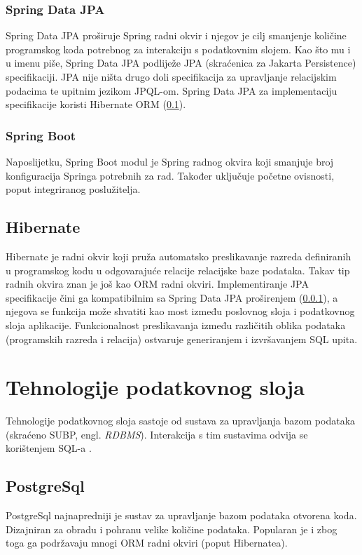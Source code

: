 \documentclass[times, utf8, zavrsni]{fer}
\begin{document}
			\subsubsection{Spring Data JPA}
			\label{subsubsec:spingdatajpa}
			Spring Data JPA proširuje Spring radni okvir i njegov je cilj smanjenje količine programskog koda potrebnog za interakciju s podatkovnim slojem. Kao što mu i u imenu piše, Spring Data JPA podliježe JPA (skraćenica za Jakarta Persistence) specifikaciji. JPA nije ništa drugo doli specifikacija za upravljanje relacijskim podacima te upitnim jezikom  JPQL-om. Spring Data JPA za implementaciju specifikacije koristi Hibernate ORM (\ref{subsec:hibernate}).\\
			\subsubsection{Spring Boot}
			Naposlijetku, Spring Boot modul je Spring radnog okvira koji smanjuje broj konfiguracija Springa potrebnih za rad. Također uključuje početne ovisnosti, poput integriranog poslužitelja.
			\subsection{Hibernate}
			\label{subsec:hibernate}
			Hibernate je radni okvir koji pruža automatsko preslikavanje razreda definiranih u programskog kodu u odgovarajuće relacije relacijske baze podataka. Takav tip radnih okvira znan je još kao ORM  radni okviri. Implementiranje JPA specifikacije čini ga kompatibilnim sa Spring Data JPA proširenjem (\ref{subsubsec:spingdatajpa}), a njegova se funkcija može shvatiti kao most između poslovnog sloja i podatkovnog sloja aplikacije. Funkcionalnost preslikavanja između različitih oblika podataka (programskih razreda i relacija) ostvaruje generiranjem i izvršavanjem SQL upita.
	
	
		\section{Tehnologije podatkovnog sloja}
		Tehnologije podatkovnog sloja sastoje od sustava za upravljanja bazom podataka  (skraćeno SUBP, engl. \textit{RDBMS}). Interakcija s tim sustavima odvija se korištenjem SQL-a .
			\subsection{PostgreSql}
			PostgreSql najnapredniji je sustav za upravljanje bazom podataka otvorena koda. Dizajniran za obradu i pohranu velike količine podataka. Popularan je i zbog toga ga podržavaju mnogi ORM radni okviri (poput Hibernatea).
\end{document}
